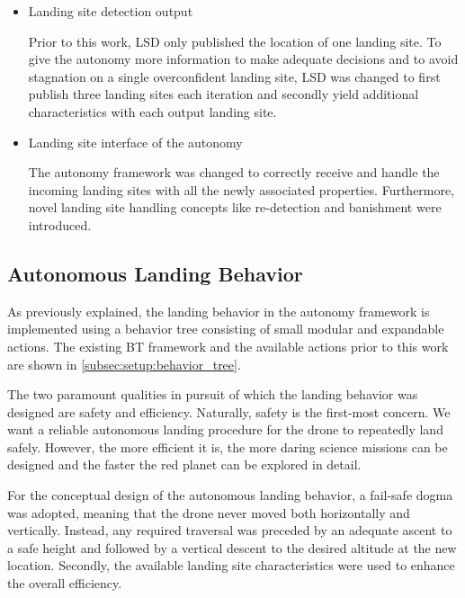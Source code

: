 \begin{itemize}
    \item Landing site detection output

    Prior to this work, LSD only published the location of one landing site. To give the autonomy more information to make adequate decisions and to avoid stagnation on a single overconfident landing site, LSD was changed to first publish three landing sites each iteration and secondly yield additional characteristics with each output landing site.
    \item Landing site interface of the autonomy

    The autonomy framework was changed to correctly receive and handle the incoming landing sites with all the newly associated properties. Furthermore, novel landing site handling concepts like re-detection and banishment were introduced.    
\end{itemize}

\subsection{Autonomous Landing Behavior}

As previously explained, the landing behavior in the autonomy framework is implemented using a behavior tree consisting of small modular and expandable actions. The existing BT framework and the available actions prior to this work are shown in \cref{subsec:setup:behavior_tree}.

The two paramount qualities in pursuit of which the landing behavior was designed are safety and efficiency. Naturally, safety is the first-most concern. We want a reliable autonomous landing procedure for the drone to repeatedly land safely. However, the more efficient it is, the more daring science missions can be designed and the faster the red planet can be explored in detail.

For the conceptual design of the autonomous landing behavior, a fail-safe dogma was adopted, meaning that the drone never moved both horizontally and vertically. Instead, any required traversal was preceded by an adequate ascent to a safe height and followed by a vertical descent to the desired altitude at the new location. Secondly, the available landing site characteristics were used to enhance the overall efficiency. 

